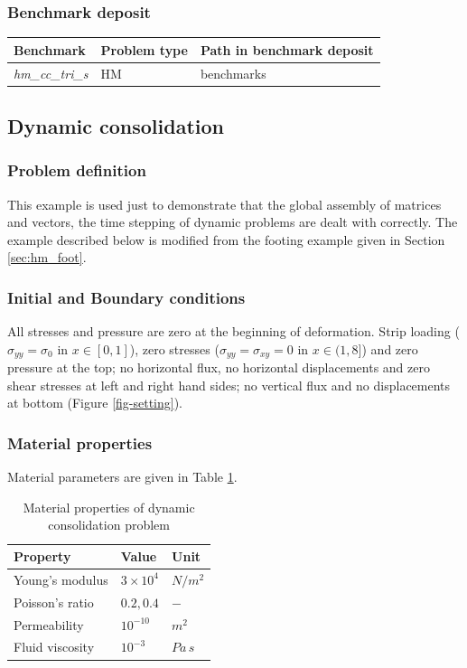 \subsubsection*{Benchmark deposit}
\begin{tabular}{|l|l|l|}
  \hline
  Benchmark & Problem type & Path in benchmark deposit \\
  \hline
\emph{hm\_cc\_tri\_s}& HM & benchmarks\verb \HM\ \\
  \hline
\end{tabular}
\subsection{Dynamic consolidation}
\subsubsection*{Problem definition}
This example is used just to demonstrate that the global assembly of matrices and vectors, the time stepping
 of dynamic problems are dealt with correctly. The example described below is modified from the footing example given
 in Section \ref{sec:hm_foot}.
\subsubsection*{Initial and Boundary conditions}
 All stresses and pressure are zero at the beginning of deformation. Strip
loading ($\sigma_{yy}=\sigma_0$ in $x\in[0,1]$), zero stresses
($\sigma_{yy}=\sigma_{xy}=0$ in $x\in(1,8]$) and zero pressure at
the top; no horizontal flux, no horizontal displacements and zero
shear stresses at left and right hand sides; no vertical flux and no
displacements at bottom (Figure \ref{fig-setting}).
\subsubsection*{Material properties}
Material parameters are given in Table \ref{tab:materials_HMd1}.
\begin{table}[!htb]
\label{tab:materials_HMd1}
\centering
\begin{tabular}{lll}
\hline\hline
{\smallskip}
Property & Value & Unit \\
\hline
Young's modulus & $3\times 10^{4}$  & $N/m^{2}$ \\
Poisson's ratio & $0.2, 0.4$       & $-$ \\
Permeability    & $10^{-10}$        & $m^2$ \\
Fluid viscosity & $10^{-3}$         & $Pa\,s$ \\
\hline\hline
\end{tabular}
\caption{Material properties of dynamic consolidation problem}
\end{table}
